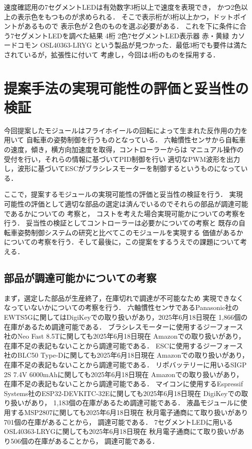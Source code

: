 \documentclass[uplatex,dvipdfmx]{jsarticle}
\begin{document}
速度確認用の7セグメントLEDは有効数字3桁以上で速度を表現でき，
かつ2色以上の表示色をもつものが求められる．
そこで表示桁が3桁以上かつ，ドットポイントがあるもので
表示色が２色のものを選ぶ必要がある．
これを下に条件に合う7セグメントLEDを調べた結果
4桁 2色7セグメントLED表示器 赤・黄緑 カソードコモン OSL40363-LRYG
という製品が見つかった\cite{seg7}．最低3桁でも要件は満たされているが，拡張性に付いて
考慮し，今回は4桁のものを採用する．


\section{提案手法の実現可能性の評価と妥当性の検証}
今回提案したモジュールはフライホイールの回転によって生まれた反作用の力を用いて
自転車の姿勢制御を行うものとなっている．
六軸慣性センサから自転車の速度，傾き，横方向加速度を取得，コントローラーからは
マニュアル操作の受付を行い，それらの情報に基づいてPID制御を行い
適切なPWM波形を出力し，波形に基づいてESCがブラシレスモーターを制御するというものになっている．

ここで，提案するモジュールの実現可能性の評価と妥当性の検証を行う．
実現可能性の評価として適切な部品の選定は済んでいるのでそれらの部品が調達可能であるかについての
考察と，
コストを考えた場合実現可能かについての考察を行う．
妥当性の検証としてコントローラーは必要かについての考察と
既存の自転車姿勢制御システムの研究と比べてこのモジュールを実現する
価値があるかについての考察を行う．そして最後に，この提案をするうえでの課題について考える．


\subsection{部品が調達可能かについての考察}
まず，選定した部品が生産終了，在庫切れで調達が不可能なため
実現できなくなっていないかについての考察を行う．
六軸慣性センサであるPanasonic社のEWTS5Gに関してはDigiKeyでの取り扱いがあり，2025年6月18日現在
1,866個の在庫があるため調達可能である\cite{rokujiku}．
ブラシレスモーターに使用するジーフォース社のNeo Fast 8.5Tに関しても2025年6月18日現在
Amazonでの取り扱いがあり，在庫不足の表記もないことから調達可能である\cite{burasiresu}．
ESCに使用するジーフォース社のBLC50 Type-Dに関しても2025年6月18日現在
Amazonでの取り扱いがあり，在庫不足の表記もないことから調達可能である\cite{esc}．
リポバッテリーに用いるSIGP 2S 7.4V 6000mAhに関しても2025年6月18日現在
Amazonでの取り扱いがあり，在庫不足の表記もないことから調達可能である\cite{lipo}．
マイコンに使用するEspressif Systems社のESP32-DEVKITC-32Eに関しても2025年6月18日現在
DigiKeyでの取り扱いがあり，
1,183個の在庫があるため調達可能である\cite{maikon}．
液晶モジュールに使用するMSP2807に関しても2025年6月18日現在
秋月電子通商にて取り扱いがあり701個の在庫があることから，
調達可能である\cite{ekisyou}．
7セグメントLEDに用いるOSL40363-LRYGに関しても2025年6月18日現在
秋月電子通商にて取り扱いがあり506個の在庫があることから，
調達可能である\cite{seg7}．
\end{document}
